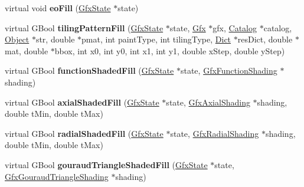 \begin{DoxyCompactItemize}
\item 
\mbox{\label{class_splash_output_dev_aa7a5a7b2e729c6a45504675551a61771}} 
virtual void {\bfseries eo\+Fill} (\hyperlink{class_gfx_state}{Gfx\+State} $\ast$state)
\item 
\mbox{\label{class_splash_output_dev_a8a3d6f9afca0c400f99150ed7af70356}} 
virtual G\+Bool {\bfseries tiling\+Pattern\+Fill} (\hyperlink{class_gfx_state}{Gfx\+State} $\ast$state, \hyperlink{class_gfx}{Gfx} $\ast$gfx, \hyperlink{class_catalog}{Catalog} $\ast$catalog, \hyperlink{class_object}{Object} $\ast$str, double $\ast$pmat, int paint\+Type, int tiling\+Type, \hyperlink{class_dict}{Dict} $\ast$res\+Dict, double $\ast$mat, double $\ast$bbox, int x0, int y0, int x1, int y1, double x\+Step, double y\+Step)
\item 
\mbox{\label{class_splash_output_dev_aa59a1cfbf186f0b962d0cf6981f0dc9b}} 
virtual G\+Bool {\bfseries function\+Shaded\+Fill} (\hyperlink{class_gfx_state}{Gfx\+State} $\ast$state, \hyperlink{class_gfx_function_shading}{Gfx\+Function\+Shading} $\ast$shading)
\item 
\mbox{\label{class_splash_output_dev_a6c94b8d6c4c996bd52f0a5bbd60882eb}} 
virtual G\+Bool {\bfseries axial\+Shaded\+Fill} (\hyperlink{class_gfx_state}{Gfx\+State} $\ast$state, \hyperlink{class_gfx_axial_shading}{Gfx\+Axial\+Shading} $\ast$shading, double t\+Min, double t\+Max)
\item 
\mbox{\label{class_splash_output_dev_aea17328bede0cfb234d5c873de21ef77}} 
virtual G\+Bool {\bfseries radial\+Shaded\+Fill} (\hyperlink{class_gfx_state}{Gfx\+State} $\ast$state, \hyperlink{class_gfx_radial_shading}{Gfx\+Radial\+Shading} $\ast$shading, double t\+Min, double t\+Max)
\item 
\mbox{\label{class_splash_output_dev_acd422c9346aae22f845cc6aa0fc5a326}} 
virtual G\+Bool {\bfseries gouraud\+Triangle\+Shaded\+Fill} (\hyperlink{class_gfx_state}{Gfx\+State} $\ast$state, \hyperlink{class_gfx_gouraud_triangle_shading}{Gfx\+Gouraud\+Triangle\+Shading} $\ast$shading)
\item 
\mbox{\label{class_splash_output_dev_a5d7d2e5da62386a53a4ccb3d1d6b1d4a}} 

\end{DoxyCompactItemize}
